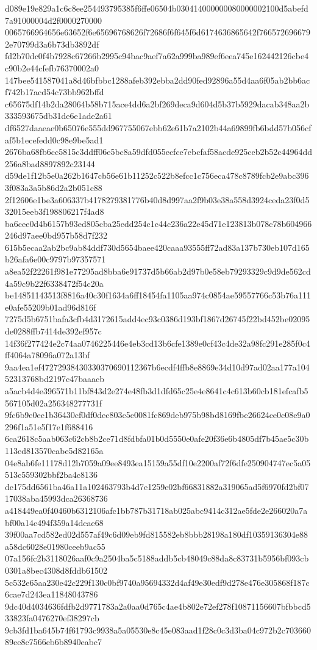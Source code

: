 {d089e19e829a1c6c8ee254493795385f6ffe06504b030414000000080000002100d5abefd7a91000004d2f0000270000
0065766964656e63652f6e65696768626f72686f6f645f6d6174636865642f7665726966792e70799d3a6b73db3892df
fd2b70dc0f4b7928c67266b2995c94bac9aef7a62a999ba989ef6eea745e162442126cbe4c90b2e44cfefb76370002a0
147bee541587041a8d46bfbbc1288afeb392ebba2dd90fed92896a55d4aa6f05ab2bb6acf742b17acd54c73bb962bffd
c65675df14b2da28064b58b715ace4dd6a2bf269deca9d604d5b37b5929dacab348aa2b333593675db31de6e1ade2a61
df6527daaeae0b65076e555dd967755067ebb62e61b7a2102b44a69899fb6bdd57b056cfaf5b1ecefedd0c98e9be5ad1
2676ba68fb6cc5815c3ddff06e5bc8a59dfd055ecfce7ebcfaf58acde925ceb2b52c44964dd256a8bad8897892c23144
d59de1f12b5e0a262b1647cb56e61b11252c522b8efcc1c756eca478c8789fcb2e9abc3963f083a3a5b86d2a2b051c88
2f12606e1be3a606337b4178279381776b40d8d997aa2f9b03e38a558d3924ceda23f0d532015eeb3f198806217f4ad8
ba6cee0d4b6157b93ed805cba25edd254c1c44c236a22e45d71e123813b078c78b604966246d97aee0bd957b58d7f232
615b5ecaa2ab2bc9ab84ddf730d5654baee420caaa93555ff72ad83a137b730eb107d165b26afa6e00c9797b97357571
a8ea52f22261f981e77295ad8bba6e91737d5b66ab2d97b0e58eb79293329c9d9de562cd4a59c9b22f6338472f54c20a
be14851143513f8816a40c30f1634a6ff18454fa1105aa974c0854ae59557766c53b76a111e0afe55209b01ad96d816f
7275d5b6751bafa3cfb4d3172615add4ec93c0386d193bf1867d26745f22bd452be02095de0288ffb7414de392ef957c
14f36f277424e2c74aa0746225446e4eb3cd13b6cfe1389e0cf43c4de32a98fc291e285f0c4ff4064a78096a072a13bf
9aa4ea1ef47272938430330370690112367b6ecdf4ffb8e8869e34d10d97ad02aa177a10452313768bd2197c47baaacb
a5acb4d4e396571b11bf843d2e274e48fb3d1dfd65c25e4e8641c4c613b60cb181efcafb5567105d02a256348277731f
9fc6b9e0ec1b36430cf0df0dec803c5e0081fc869deb975b98bd8169fbe26624ce0c08e9a0296f1a51e5f17e1f688416
6ca2618c5aab063c62cb8b2ce71d8fdbfa01b0d5550e0afe20f36e6b4805df7b45ae5c30b113ed813570cabe5d82165a
04e8ab6fe11178d12b7059a09ee8493ea15159a55df10e2200af72f6dfe250904747ec5a05513c559302bbf2ba4c8136
de175dd6561ba46a11a102463793b4d7e1259e02bf66831882a319065ad5f6970fd2bf0717038aba45993dca26368736
a418449ea0f40460b6312106afc1bb787b31718ab025abc9414c312ae5fde2e266020a7abf00a14e494f359a14dcae68
39f00aa7cd582ed02d557af49c6d09eb9fd815582eb8bbb28198a180df10359136304e88a58dc6028e01980ceeb9ac55
07a156fc2b3118026aaf0c9a2504ba5c5188addb5cb48049c88da8c83731b5956bf093cb0301a8bec4308d8fddb61502
5c532e65aa230e42c229f130c0bf9740a95694332d4af49e30edf9d278e476e305868f187c6cae7d243ea11848043786
9dc40d4034636fdfb2d9771783a2a0aa0d765c4ae4b802e72ef278f10871156607bfbbcd533823fa0476270ef38297cb
9cb3fd1ba645b74f61793c9938a5a05530e8c45e083aad1f28c0c3d3ba04c972b2c70366089ee8c7566eb6b8940eabc7
}
